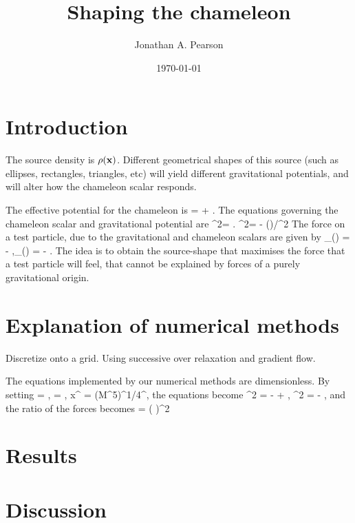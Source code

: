 \documentclass[amsmath,amssymb,10pt,eqsecnum, twocolumn]{revtex4}
\begin{document}
\title{Shaping the chameleon}
\author{Jonathan A. Pearson}
\date{\today}

\maketitle




 
 
 
\section{Introduction}

The source density is $\rho({\bf{x}})$.  Different geometrical shapes of this source (such as ellipses, rectangles, triangles, etc) will yield different gravitational potentials, and will alter how the chameleon scalar responds.

The effective potential for the chameleon is
\bea
{} =  + \phi.
\eea
The equations governing the chameleon scalar and gravitational potential are
\bse
\bea
\nabla^2\phi = .
\eea
\bea
\nabla^2\Phi = - \rho()/^2
\eea
\ese
The force on a test particle, due to the gravitational and chameleon scalars are given by
\bea
{}_{(\phi)} = - \nabla\phi,\qquad {}_{(\Phi)} = - \nabla\Phi.
\eea
The idea is to obtain the source-shape that maximises the force that a test particle will feel, that cannot be explained by forces of a purely gravitational origin.


\section{Explanation of numerical methods}
Discretize onto a grid. Using successive over relaxation and gradient flow.

The equations   implemented by our numerical methods are dimensionless. By setting
\bse
\bea
\phi = \tilde{\phi},
\eea
\bea
\Phi = \tilde{\Phi},
\eea
\bea
x^{\mu} = \left(M\Lambda^5\right)^{1/4}^{\mu},
\eea
\ese
the equations become
\bse
\bea
\tilde{\nabla}^2\tilde{\phi} = -  + \rho,
\eea
\bea
\tilde{\nabla}^2\tilde{\Phi} = - \half \rho,
\eea
\ese
and the ratio of the  forces becomes
\bea
{} = \left( \right)^2\frac{\left| \tilde{\nabla}\tilde{\phi}\right|}{\left| \tilde{\nabla}\tilde{\Phi}\right|}
\eea
\section{Results}

\section{Discussion}
\end{document}
